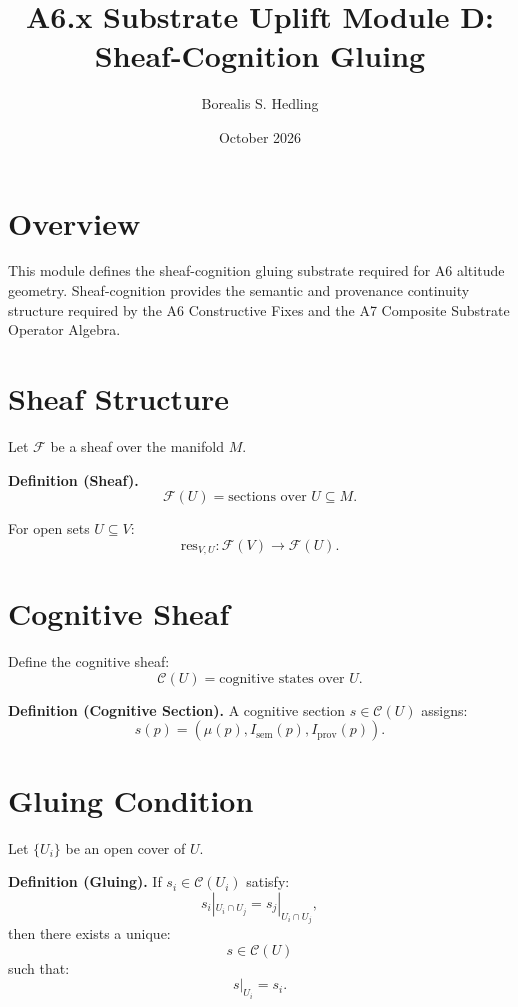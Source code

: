 \documentclass[11pt]{article}
\title{A6.x Substrate Uplift Module D: Sheaf-Cognition Gluing}
\author{Borealis S. Hedling}
\date{October 2026}
\begin{document}
\maketitle

\section*{Overview}

This module defines the sheaf-cognition gluing substrate required for A6
altitude geometry. Sheaf-cognition provides the semantic and provenance
continuity structure required by the A6 Constructive Fixes and the A7 Composite
Substrate Operator Algebra.

\section{Sheaf Structure}

Let $\mathcal{F}$ be a sheaf over the manifold $M$.

\textbf{Definition (Sheaf).}
\[
\mathcal{F}(U) = \text{sections over } U \subseteq M.
\]

For open sets $U \subseteq V$:
\[
\mathrm{res}_{V,U} : \mathcal{F}(V) \to \mathcal{F}(U).
\]

\section{Cognitive Sheaf}

Define the cognitive sheaf:
\[
\mathcal{C}(U) = \text{cognitive states over } U.
\]

\textbf{Definition (Cognitive Section).}
A cognitive section $s \in \mathcal{C}(U)$ assigns:
\[
s(p) = (\mu(p), I_{\mathrm{sem}}(p), I_{\mathrm{prov}}(p)).
\]

\section{Gluing Condition}

Let $\{U_i\}$ be an open cover of $U$.

\textbf{Definition (Gluing).}
If $s_i \in \mathcal{C}(U_i)$ satisfy:
\[
s_i|_{U_i \cap U_j} = s_j|_{U_i \cap U_j},
\]
then there exists a unique:
\[
s \in \mathcal{C}(U)
\]
such that:
\[
s|_{U_i} = s_i.
\]
\end{document}
